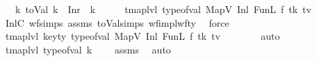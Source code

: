 \begin{isabellebody}
\ \ \ {\isachardoublequoteopen}{\isasymexists}k{\isacharprime}{\kern0pt}{\isachardot}{\kern0pt}\ toVal{}{}{}{}\ k\ {\isacharequal}{\kern0pt}\ Inr\ {\isacharparenleft}{\kern0pt}\ k{\isacharprime}{\kern0pt}{\isacharparenright}{\kern0pt}{\isachardoublequoteclose}\isanewline
%
\isadelimproof
%
\endisadelimproof
%
\isatagproof
{}\isamarkupfalse%
\ {\isacharminus}{\kern0pt}\isanewline
\ \ \isamarkupfalse%
\ {\isachardoublequoteopen}tmap{\isacharunderscore}{\kern0pt}lvl\ {\isacharparenleft}{\kern0pt}type{\isacharunderscore}{\kern0pt}of{\isacharunderscore}{\kern0pt}val\ {\isacharparenleft}{\kern0pt}MapV\ {\isacharparenleft}{\kern0pt}Inl\ {\isacharparenleft}{\kern0pt}FunL\ f\ tk\ tv{\isacharparenright}{\kern0pt}{\isacharparenright}{\kern0pt}{\isacharparenright}{\kern0pt}{\isacharparenright}{\kern0pt}\ {\isacharequal}{\kern0pt}\ {}{\isachardoublequoteclose}\isanewline
\ \ \ \ \isamarkupfalse%
\ InlC{}\ wf{\isachardot}{\kern0pt}simps\ assms{\isacharparenleft}{\kern0pt}{}{\isacharparenright}{\kern0pt}\ toVal{}{}{}{}{\isachardot}{\kern0pt}simps\ wf{\isacharunderscore}{\kern0pt}impl{\isacharunderscore}{\kern0pt}wf{\isacharunderscore}{\kern0pt}ty\ \isamarkupfalse%
\ force\isanewline
\ \ \isamarkupfalse%
\ \isamarkupfalse%
\ {\isachardoublequoteopen}tmap{\isacharunderscore}{\kern0pt}lvl\ {\isacharparenleft}{\kern0pt}key{\isacharunderscore}{\kern0pt}ty\ {\isacharparenleft}{\kern0pt}type{\isacharunderscore}{\kern0pt}of{\isacharunderscore}{\kern0pt}val\ {\isacharparenleft}{\kern0pt}MapV\ {\isacharparenleft}{\kern0pt}Inl\ {\isacharparenleft}{\kern0pt}FunL\ f\ tk\ tv{\isacharparenright}{\kern0pt}{\isacharparenright}{\kern0pt}{\isacharparenright}{\kern0pt}{\isacharparenright}{\kern0pt}{\isacharparenright}{\kern0pt}\ {\isasymle}\ {}{\isachardoublequoteclose}\isanewline
\ \ \ \ \isamarkupfalse%
\ auto\isanewline
\ \ \isamarkupfalse%
\ \isamarkupfalse%
\ {\isachardoublequoteopen}tmap{\isacharunderscore}{\kern0pt}lvl\ {\isacharparenleft}{\kern0pt}type{\isacharunderscore}{\kern0pt}of{\isacharunderscore}{\kern0pt}val\ k{\isacharparenright}{\kern0pt}\ {\isasymle}\ {}{\isachardoublequoteclose}\ \isamarkupfalse%
\ assms\ \isamarkupfalse%
\ auto\isanewline
\ \ \isamarkupfalse%
\ \isamarkupfalse%

\end{isabellebody}
